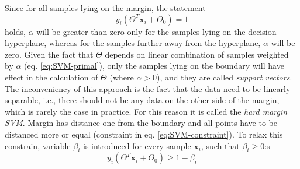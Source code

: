 Since for all samples lying on the margin, the statement  
\begin{equation}
y_i \left( \Theta^T\mathbf{x}_i + \Theta_0  \right) = 1
\end{equation}
\noindent holds, $\alpha$ will be greater than zero only for the samples lying on the decision hyperplane, whereas for the samples further away from the hyperplane, $\alpha$ will be zero. Given the fact that $\Theta$ depends on linear combination of samples weighted by $\alpha$ (eq. \ref{eq:SVM-primal}), only the samples lying on the boundary will have effect in the calculation of $\Theta$ (where $\alpha > 0$), and they are called \emph{support vectors}. The inconveniency of this approach is the fact that the data need to be linearly separable, i.e., there should not be any data on the other side of the margin, which is rarely the case in practice. For this reason it is called the \emph{hard margin SVM}. Margin has distance one from the boundary and all points have to be distanced more or equal (constraint in eq. \ref{eq:SVM-constraint}). To relax this constrain, variable $\beta_i$ is introduced for every sample $\mathbf{x}_i$, such that $\beta_i \geq 0$:s
\begin{equation} 
 y_i \left(\Theta^T \mathbf{x}_i + \Theta_0\right) \geq 1 - \beta_i
\end{equation}


